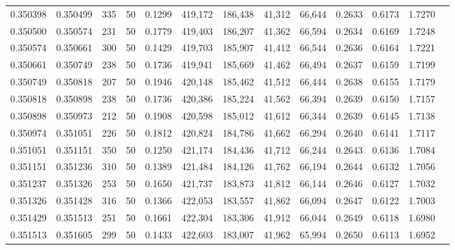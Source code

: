 \begin{tabular}{rrrrrrrrrrrrr}
0.350398 & 0.350499 &   335 &  50 &                                     0.1299 & 419,172 & 186,438 &  41,312 &  66,644 & 0.2633 & 0.6173 & 1.7270 \\
0.350500 & 0.350574 &   231 &  50 &                                     0.1779 & 419,403 & 186,207 &  41,362 &  66,594 & 0.2634 & 0.6169 & 1.7248 \\
0.350574 & 0.350661 &   300 &  50 &                                     0.1429 & 419,703 & 185,907 &  41,412 &  66,544 & 0.2636 & 0.6164 & 1.7221 \\
0.350661 & 0.350749 &   238 &  50 &                                     0.1736 & 419,941 & 185,669 &  41,462 &  66,494 & 0.2637 & 0.6159 & 1.7199 \\
0.350749 & 0.350818 &   207 &  50 &                                     0.1946 & 420,148 & 185,462 &  41,512 &  66,444 & 0.2638 & 0.6155 & 1.7179 \\
0.350818 & 0.350898 &   238 &  50 &                                     0.1736 & 420,386 & 185,224 &  41,562 &  66,394 & 0.2639 & 0.6150 & 1.7157 \\
0.350898 & 0.350973 &   212 &  50 &                                     0.1908 & 420,598 & 185,012 &  41,612 &  66,344 & 0.2639 & 0.6145 & 1.7138 \\
0.350974 & 0.351051 &   226 &  50 &                                     0.1812 & 420,824 & 184,786 &  41,662 &  66,294 & 0.2640 & 0.6141 & 1.7117 \\
0.351051 & 0.351151 &   350 &  50 &                                     0.1250 & 421,174 & 184,436 &  41,712 &  66,244 & 0.2643 & 0.6136 & 1.7084 \\
0.351151 & 0.351236 &   310 &  50 &                                     0.1389 & 421,484 & 184,126 &  41,762 &  66,194 & 0.2644 & 0.6132 & 1.7056 \\
0.351237 & 0.351326 &   253 &  50 &                                     0.1650 & 421,737 & 183,873 &  41,812 &  66,144 & 0.2646 & 0.6127 & 1.7032 \\
0.351326 & 0.351428 &   316 &  50 &                                     0.1366 & 422,053 & 183,557 &  41,862 &  66,094 & 0.2647 & 0.6122 & 1.7003 \\
0.351429 & 0.351513 &   251 &  50 &                                     0.1661 & 422,304 & 183,306 &  41,912 &  66,044 & 0.2649 & 0.6118 & 1.6980 \\
0.351513 & 0.351605 &   299 &  50 &                                     0.1433 & 422,603 & 183,007 &  41,962 &  65,994 & 0.2650 & 0.6113 & 1.6952 \\

\end{tabular}
